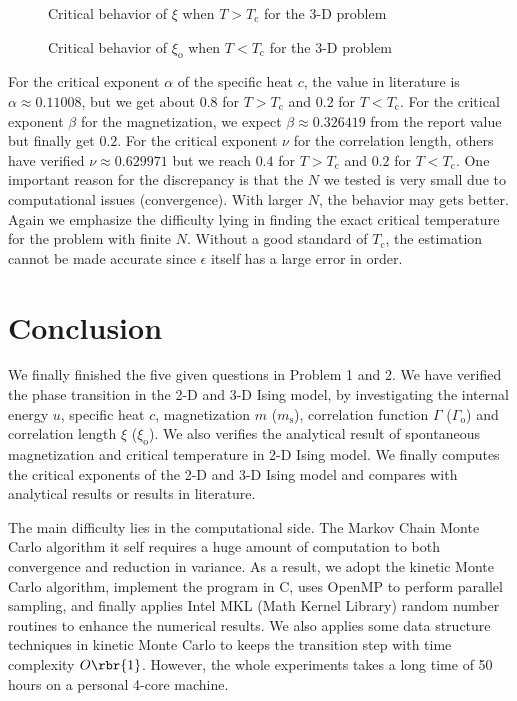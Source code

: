 \documentclass[english, nochinese]{pnote}
\begin{document}
\begin{figure}[htbp]
\centering

\caption{Critical behavior of $\xi$ when $ T > T_{\text{c}}$ for the 3-D problem}
\label{Fig:CritXiHigh3D}
\end{figure}

\begin{figure}[htbp]
\centering

\caption{Critical behavior of $\xi_{\text{o}}$ when $ T < T_{\text{c}}$ for the 3-D problem}
\label{Fig:CritXiLow3D}
\end{figure}

For the critical exponent $\alpha$ of the specific heat $c$, the value in literature is $ \alpha \approx 0.11008 $, but we get about $0.8$ for $ T > T_{\text{c}} $ and $0.2$ for $ T < T_{\text{c}} $. For the critical exponent $\beta$ for the magnetization, we expect $ \beta \approx 0.326419 $ from the report value but finally get $0.2$. For the critical exponent $\nu$ for the correlation length, others have verified $ \nu \approx 0.629971 $ but we reach $0.4$ for $ T > T_{\text{c}} $ and $0.2$ for $ T < T_{\text{c}} $. One important reason for the discrepancy is that the $N$ we tested is very small due to computational issues (convergence). With larger $N$, the behavior may gets better. Again we emphasize the difficulty lying in finding the exact critical temperature for the problem with finite $N$. Without a good standard of $T_{\text{c}}$, the estimation cannot be made accurate since $\epsilon$ itself has a large error in order.

\section{Conclusion}

We finally finished the five given questions in Problem 1 and 2. We have verified the phase transition in the 2-D and 3-D Ising model, by investigating the internal energy $u$, specific heat $c$, magnetization $m$ ($m_{\text{s}}$), correlation function $\Gamma$ ($\Gamma_{\text{o}}$) and correlation length $\xi$ ($\xi_{\text{o}}$). We also verifies the analytical result of spontaneous magnetization and critical temperature in 2-D Ising model. We finally computes the critical exponents of the 2-D and 3-D Ising model and compares with analytical results or results in literature.

The main difficulty lies in the computational side. The Markov Chain Monte Carlo algorithm it self requires a huge amount of computation to both convergence and reduction in variance. As a result, we adopt the kinetic Monte Carlo algorithm, implement the program in C, uses OpenMP to perform parallel sampling, and finally applies Intel MKL (Math Kernel Library) random number routines to enhance the numerical results. We also applies some data structure techniques in kinetic Monte Carlo to keeps the transition step with time complexity $ O \rbr{1} $. However, the whole experiments takes a long time of 50 hours on a personal 4-core machine.
\end{document}

